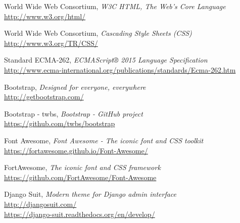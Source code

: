 \begin{thebibliography}{99}
	World Wide Web Consortium, \emph{W3C HTML, The Web’s Core Language} \\
	\url{http://www.w3.org/html/}
	
	World Wide Web Consortium, \emph{Cascading Style Sheets (CSS)} \\
	\url{http://www.w3.org/TR/CSS/}
	
	Standard ECMA-262, \emph{ECMAScript® 2015 Language Specification} \\
	\url{http://www.ecma-international.org/publications/standards/Ecma-262.htm}
	
	Bootstrap, \emph{Designed for everyone, everywhere} \\
	\url{http://getbootstrap.com/}

	Bootstrap - twbs, \emph{Bootstrap - GitHub project} \\
	\url{https://github.com/twbs/bootstrap}
	
	Font Awesome, \emph{Font Awesome - The iconic font and CSS toolkit} \\
	\url{https://fortawesome.github.io/Font-Awesome/}

	FortAwesome, \emph{The iconic font and CSS framework} \\
	\url{https://github.com/FortAwesome/Font-Awesome}

	Django Suit, \emph{Modern theme for Django admin interface} \\
	\url{http://djangosuit.com/} \\
	\url{https://django-suit.readthedocs.org/en/develop/}
	
\end{thebibliography}